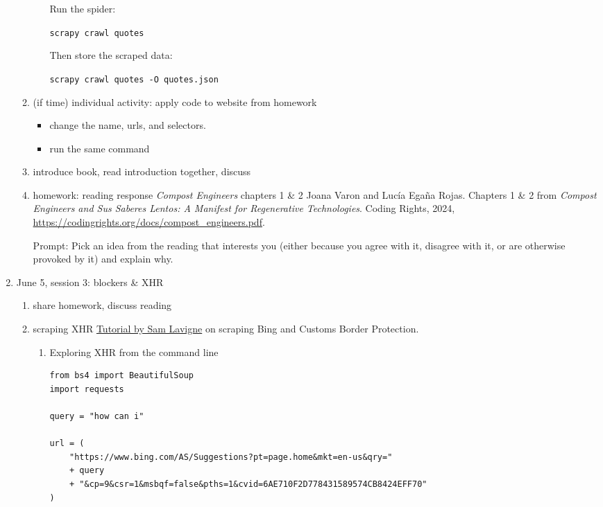 \documentclass[11pt]{article}
\begin{document}
\begin{enumerate}
\begin{enumerate}
\begin{enumerate}
Run the spider:

\texttt{scrapy crawl quotes}

Then store the scraped data:

\texttt{scrapy crawl quotes -O quotes.json}
\end{enumerate}

\item (if time) individual activity: apply code to website from homework
\label{sec:org58dc317}
\begin{itemize}
\item change the name, urls, and selectors.
\item run the same command
\end{itemize}

\item introduce book, read introduction together, discuss
\label{sec:org1d9b679}
\item homework: reading response \emph{Compost Engineers} chapters 1 \& 2
\label{sec:orgc894d4e}
Joana Varon and Lucía Egaña Rojas. Chapters 1 \& 2 from \emph{Compost
Engineers and Sus Saberes Lentos: A Manifest for Regenerative
Technologies}. Coding Rights, 2024,
\url{https://codingrights.org/docs/compost\_engineers.pdf}.

Prompt: Pick an idea from the reading that interests you (either
because you agree with it, disagree with it, or are otherwise provoked
by it) and explain why.
\end{enumerate}

\item June 5, session 3: blockers \& XHR
\label{sec:orgc259363}
\begin{enumerate}
\item share homework, discuss reading
\label{sec:org40e4e7c}
\item scraping XHR
\label{sec:org435909f}
\href{https://scrapism.lav.io/scraping-xhr/}{Tutorial by Sam Lavigne} on scraping Bing and Customs Border
Protection.

\begin{enumerate}
\item Exploring XHR from the command line
\label{sec:org35dfa24}

\begin{verbatim}
from bs4 import BeautifulSoup
import requests

query = "how can i"

url = (
    "https://www.bing.com/AS/Suggestions?pt=page.home&mkt=en-us&qry="
    + query
    + "&cp=9&csr=1&msbqf=false&pths=1&cvid=6AE710F2D778431589574CB8424EFF70"
)


\end{verbatim}
\end{enumerate}
\end{enumerate}
\end{enumerate}
\end{document}
